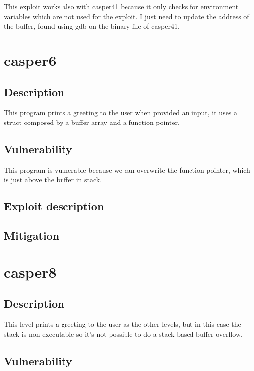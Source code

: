 \documentclass[a4paper,12pt]{article}
\begin{document}
This exploit works also with casper41 because it only checks for environment variables which are not used for the exploit. I just need to update the address of the buffer, found using gdb on the binary file of casper41.



\section{casper6}


\subsection{Description}

This program prints a greeting to the user when provided an input, it uses a struct composed by a buffer array and a function pointer.

\subsection{Vulnerability}

This program is vulnerable because we can overwrite the function pointer, which is just above the buffer in stack.

\subsection{Exploit description}

\subsection{Mitigation}

\section{casper8}
\subsection{Description}

This level prints a greeting to the user as the other levels, but in this case the stack is non-executable so it's not possible to do a stack based buffer overflow.
\subsection{Vulnerability}
\end{document}
